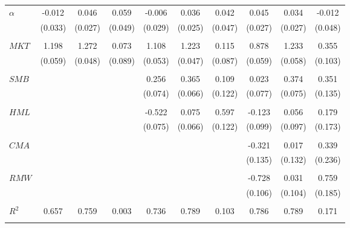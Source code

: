 \begin{tabular}{lccccccccc}
$\alpha$ & -0.012  & 0.046 & 0.059 & -0.006  & 0.036 & 0.042 & 0.045  & 0.034 & -0.012 \\ 
 & (0.033) & (0.027) & (0.049) & (0.029) & (0.025) & (0.047) & (0.027) & (0.027) & (0.048) \\ \\[-1.8ex] 
$MKT$ & 1.198   & 1.272   & 0.073 & 1.108  & 1.223 & 0.115 & 0.878  & 1.233 & 0.355 \\ 
               & (0.059) & (0.048) & (0.089) & (0.053) & (0.047) & (0.087) & (0.059) & (0.058) & (0.103) \\ \\[-1.8ex] 
$SMB$ &   &  &  & 0.256  & 0.365 & 0.109 & 0.023  & 0.374 & 0.351  \\ 
 &   &   &  &  (0.074) & (0.066) & (0.122) & (0.077) & (0.075) & (0.135) \\ \\[-1.8ex] $HML$ &   &  &  & -0.522  & 0.075 & 0.597 & -0.123  & 0.056 & 0.179 \\ 
       &    &   &  &  (0.075) & (0.066) & (0.122) & (0.099) & (0.097) & (0.173) \\ \\[-1.8ex] 
$CMA$ &   &  &  & & & & -0.321  & 0.017 & 0.339  \\ 
      &   &  &  & & & & (0.135) & (0.132) & (0.236) \\ \\[-1.8ex]
 $RMW$ &   &  &  & & & & -0.728  & 0.031 & 0.759  \\ 
      &   &  &  & & & & (0.106) & (0.104) & (0.185) \\ \\[-1.8ex] 
$R^2$ & 0.657  & 0.759 & 0.003 & 0.736  & 0.789 & 0.103 & 0.786  & 0.789 & 0.171 \\ \\[-1.8ex] 
\bottomrule 
\end{tabular}